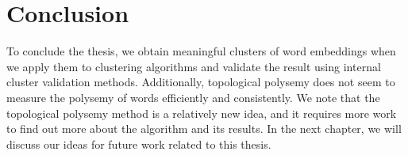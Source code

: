\section{Conclusion}
\label{sec:conclusion}
To conclude the thesis, we obtain meaningful clusters of word embeddings when we apply them to clustering algorithms and validate the result using internal cluster validation methods. Additionally, topological polysemy does not seem to measure the polysemy of words efficiently and consistently. We note that the topological polysemy method is a relatively new idea, and it requires more work to find out more about the algorithm and its results. In the next chapter, we will discuss our ideas for future work related to this thesis.